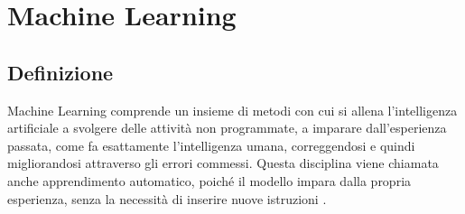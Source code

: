 

\section{Machine Learning}
\subsection{Definizione}

Machine Learning comprende un insieme di metodi con cui si allena l’intelligenza artificiale 
a svolgere delle attività non programmate, a imparare dall’esperienza passata, 
come fa esattamente l’intelligenza umana, correggendosi 
e quindi migliorandosi attraverso gli errori commessi.
Questa disciplina viene chiamata anche apprendimento automatico, poiché il modello
impara dalla propria esperienza, senza la necessità di inserire 
nuove istruzioni \cite{IA_ML_DL}.


